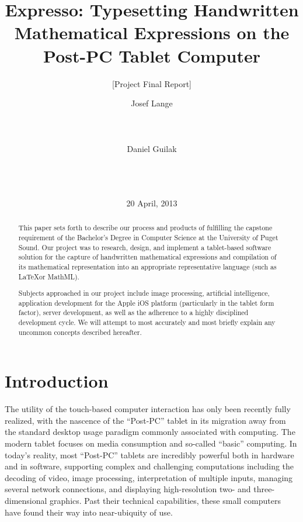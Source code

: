 \documentclass{acm_proc_article-sp}
\begin{document}
\title{ Expresso: Typesetting Handwritten Mathematical Expressions on the Post-PC Tablet Computer }
\subtitle{ [Project Final Report] }


\author{
\alignauthor
Josef Lange\\
       \\
       \\
       \\
\alignauthor       
Daniel Guilak\\
       \\
       \\
       \\
}
       
\date{20 April, 2013}

\maketitle

\begin{abstract}
This paper sets forth to describe our process and products of fulfilling the capstone requirement of the Bachelor's Degree in Computer Science at the University of Puget Sound. Our project was to research, design, and implement a tablet-based software solution for the capture of handwritten mathematical expressions and compilation of its mathematical representation into an appropriate representative language (such as \LaTeX or MathML).

Subjects approached in our project include image processing, artificial intelligence, application development for the Apple iOS platform (particularly in the tablet form factor), server development, as well as the adherence to a highly disciplined development cycle. We will attempt to most accurately and most briefly explain any uncommon concepts described hereafter.
\end{abstract}

\section{Introduction}
The utility of the touch-based computer interaction has only been recently fully realized, with the nascence of the ``Post-PC'' tablet in its migration away from the standard desktop usage paradigm commonly associated with computing. The modern tablet focuses on media consumption and so-called ``basic'' computing. In today's reality, most ``Post-PC'' tablets are incredibly powerful both in hardware and in software, supporting complex and challenging computations including the decoding of video, image processing, interpretation of multiple inputs, managing several network connections, and displaying high-resolution two- and three-dimensional graphics. Past their technical capabilities, these small computers have found their way into near-ubiquity of use. 
\end{document}
